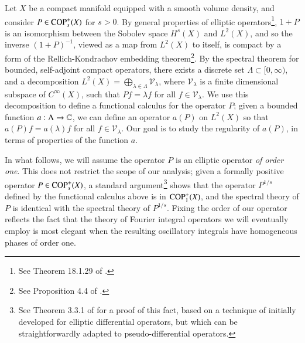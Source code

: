 Let $X$ be a compact manifold equipped with a smooth volume density, and consider $P \in {\text{COP}^{+}_{{s}}}(X)$ for $s > 0$. By general properties of elliptic operators\footnote{See Theorem 18.1.29 of \cite{Hormander3}.}, $1 + P$ is an isomorphism between the Sobolev space $H^s(X)$ and $L^2(X)$,
%
%
and so the inverse $(1 + P)^{-1}$, viewed as a map from $L^2(X)$ to itself, is compact by a form of the Rellich-Kondrachov embedding theorem\footnote{See Proposition 4.4 of \cite{Taylor}.}. By the spectral theorem for bounded, self-adjoint compact operators, there exists a discrete set $\Lambda \subset [0,\infty)$, and a decomposition $L^2(X) = \bigoplus\nolimits_{\lambda \in \Lambda} \mathcal{V}_\lambda$, where $\mathcal{V}_\lambda$ is a finite dimensional subspace of $C^\infty(X)$, such that $Pf = \lambda f$ for all $f \in \mathcal{V}_\lambda$. We use this decomposition to define a functional calculus for the operator $P$; given a bounded function $a: \Lambda \to \operatorname{\mathbb{C}}$, we can define an operator $a(P)$ on $L^2(X)$ so that $a(P) f = a(\lambda) f$ for all $f \in \mathcal{V}_\lambda$. Our goal is to study the regularity of $a(P)$, in terms of properties of the function $a$.

In what follows, we will assume the operator $P$ is an elliptic operator \emph{of order one}. This does not restrict the scope of our analysis; given a formally positive operator $P \in {\text{COP}^{+}_{{s}}}(X)$, a standard argument\footnote{See Theorem 3.3.1 of \cite{Sogge} for a proof of this fact, based on a technique of \cite{Seeley} initially developed for elliptic differential operators, but which can be straightforwardly adapted to pseudo-differential operators.} shows that the operator $P^{1/s}$ defined by the functional calculus above is in ${\text{COP}^{+}_{{1}}}(X)$, and the spectral theory of $P$ is identical with the spectral theory of $P^{1/s}$. Fixing the order of our operator reflects the fact that the theory of Fourier integral operators we will eventually employ is most elegant when the resulting oscillatory integrals have homogeneous phases of order one.

%
%

